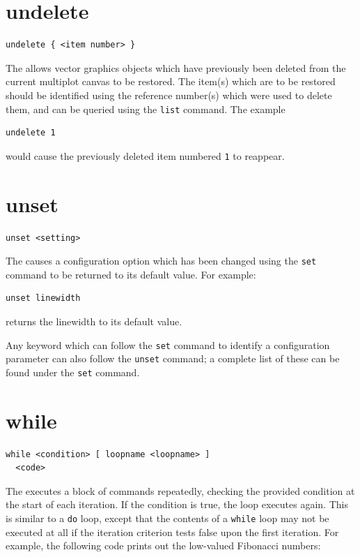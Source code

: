 \section{undelete}

\begin{verbatim}
undelete { <item number> }
\end{verbatim}

The  allows vector graphics objects which have previously
been deleted from the current multiplot canvas to be restored.  The item(s)
which are to be restored should be identified using the reference number(s)
which were used to delete them, and can be queried using the {\tt list}
command. The example

\begin{verbatim}
undelete 1
\end{verbatim}

\noindent would cause the previously deleted item numbered {\tt 1} to reappear.


\section{unset}

\begin{verbatim}
unset <setting>
\end{verbatim}

The  causes a configuration option which has been changed using
the {\tt set} command to be returned to its default value.  For example:

\begin{verbatim}
unset linewidth
\end{verbatim}

\noindent returns the linewidth to its default value.

Any keyword which can follow the {\tt set} command to identify a configuration
parameter can also follow the {\tt unset} command; a complete list of these can
be found under the {\tt set} command.


\section{while}

\begin{verbatim}
while <condition> [ loopname <loopname> ]
  <code>
\end{verbatim}

The  executes a block of commands repeatedly, checking the
provided condition at the start of each iteration. If the condition is true,
the loop executes again. This is similar to a {\tt do} loop, except that the
contents of a {\tt while} loop may not be executed at all if the iteration
criterion tests false upon the first iteration. For example, the following code
prints out the low-valued Fibonacci numbers:

